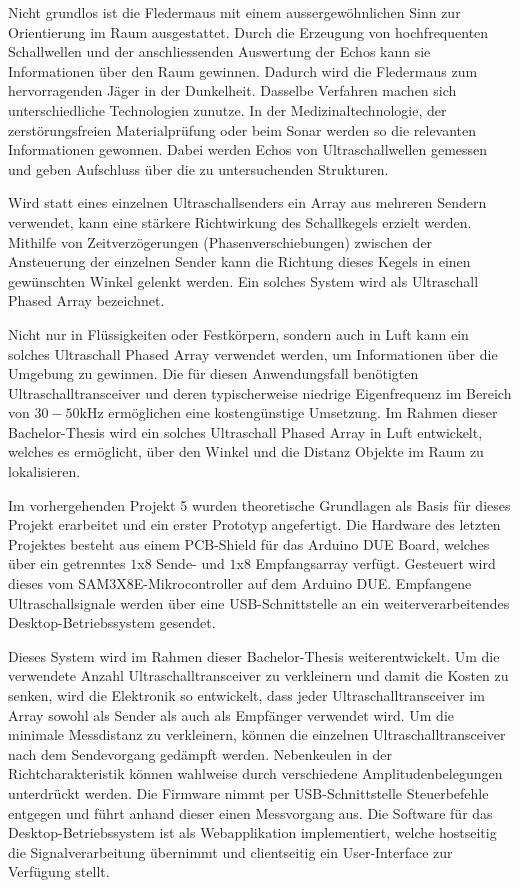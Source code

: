 Nicht grundlos ist die Fledermaus mit einem aussergewöhnlichen Sinn zur Orientierung im Raum ausgestattet. Durch die Erzeugung von hochfrequenten Schallwellen und der anschliessenden Auswertung der Echos kann sie Informationen über den Raum gewinnen. Dadurch wird die Fledermaus zum hervorragenden Jäger in der Dunkelheit.
Dasselbe Verfahren machen sich unterschiedliche Technologien zunutze. In der Medizinaltechnologie, der zerstörungsfreien Materialprüfung oder beim Sonar werden so die relevanten Informationen gewonnen. Dabei werden Echos von Ultraschallwellen gemessen und geben Aufschluss über die zu untersuchenden Strukturen.

Wird statt eines einzelnen Ultraschallsenders ein Array aus mehreren Sendern verwendet, kann eine stärkere Richtwirkung des Schallkegels erzielt werden. Mithilfe von Zeitverzögerungen (Phasenverschiebungen) zwischen der Ansteuerung der einzelnen Sender kann die Richtung dieses Kegels in einen gewünschten Winkel gelenkt werden. Ein solches System wird als Ultraschall Phased Array bezeichnet.

Nicht nur in Flüssigkeiten oder Festkörpern, sondern auch in Luft kann ein solches Ultraschall Phased Array verwendet werden, um Informationen über die Umgebung zu gewinnen. Die für diesen Anwendungsfall benötigten Ultraschalltransceiver und deren typischerweise niedrige Eigenfrequenz im Bereich von $30 - 50 \mathrm{kHz}$ ermöglichen eine kostengünstige Umsetzung. Im Rahmen dieser Bachelor-Thesis wird ein solches Ultraschall Phased Array in Luft entwickelt, welches es ermöglicht, über den Winkel und die Distanz Objekte im Raum zu lokalisieren.

Im vorhergehenden Projekt 5 wurden theoretische Grundlagen als Basis für dieses Projekt erarbeitet und ein erster Prototyp angefertigt. Die Hardware des letzten Projektes besteht aus einem PCB-Shield für das Arduino DUE Board, welches über ein getrenntes $1$x$8$ Sende- und $1$x$8$ Empfangsarray verfügt. Gesteuert wird dieses vom SAM3X8E-Mikrocontroller auf dem Arduino DUE. Empfangene Ultraschallsignale werden über eine USB-Schnittstelle an ein weiterverarbeitendes Desktop-Betriebssystem gesendet.

Dieses System wird im Rahmen dieser Bachelor-Thesis weiterentwickelt. Um die verwendete Anzahl Ultraschalltransceiver zu verkleinern und damit die Kosten zu senken, wird die Elektronik so entwickelt, dass jeder Ultraschalltransceiver im Array sowohl als Sender als auch als Empfänger verwendet wird. Um die minimale Messdistanz zu verkleinern, können die einzelnen Ultraschalltransceiver nach dem Sendevorgang gedämpft werden. Nebenkeulen in der Richtcharakteristik können wahlweise durch verschiedene Amplitudenbelegungen unterdrückt werden. Die Firmware nimmt per USB-Schnittstelle Steuerbefehle entgegen und führt anhand dieser einen Messvorgang aus. Die Software für das Desktop-Betriebssystem ist als Webapplikation implementiert, welche hostseitig die Signalverarbeitung übernimmt und clientseitig ein User-Interface zur Verfügung stellt.

